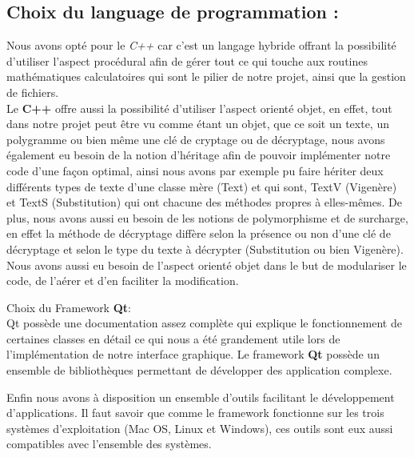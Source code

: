 \documentclass[11pt]{article}
\begin{document}
\begin{enumerate}
\section{Choix du language de programmation :}
Nous avons opté pour le \textit{C++} car c'est un langage hybride offrant la possibilité d’utiliser l’aspect procédural afin de gérer tout ce qui touche aux routines mathématiques calculatoires qui sont le pilier de notre projet, ainsi que la gestion de fichiers. \\
Le \textbf{C++} offre aussi la possibilité d'utiliser l’aspect orienté objet, en effet, tout dans notre projet peut être vu comme étant un objet, que ce soit un texte, un polygramme ou bien même une clé de cryptage ou de décryptage, nous avons également eu besoin de la notion d'héritage afin de pouvoir implémenter notre code d'une façon optimal, ainsi nous avons par exemple pu faire hériter deux différents types de texte d'une classe mère (Text) et qui sont, TextV (Vigenère) et TextS (Substitution) qui ont chacune des méthodes propres à elles-mêmes.
De plus, nous avons aussi eu besoin  de les notions de polymorphisme et de surcharge, en effet la méthode de décryptage diffère selon la présence ou non d'une clé de décryptage et selon le type du texte à décrypter (Substitution ou bien Vigenère).
Nous avons aussi eu besoin de l'aspect orienté objet dans le but de modulariser le code, de l’aérer et d’en faciliter la modification.

Choix du Framework \textbf{Qt}: \\
Qt possède une documentation assez complète qui explique le fonctionnement de certaines classes en détail ce qui nous a été grandement utile lors de l'implémentation de notre interface graphique. Le framework \textbf{Qt} possède un ensemble de bibliothèques permettant de développer des application complexe.

Enfin nous avons à disposition un ensemble d’outils facilitant le développement d’applications. Il faut savoir que comme le framework fonctionne sur les trois systèmes d’exploitation (Mac OS, Linux et Windows), ces outils sont eux aussi compatibles avec l’ensemble des systèmes.



\end{enumerate}
\end{document}
